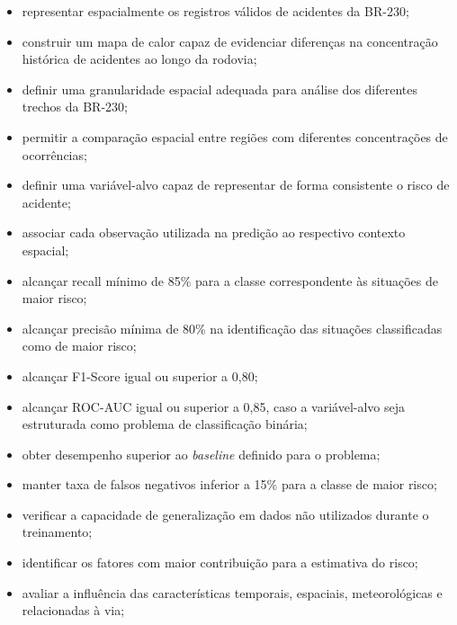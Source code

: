 \documentclass[11pt,a4paper]{article}
\begin{document}
\begin{itemize}

    \item representar espacialmente os registros válidos de acidentes da BR-230;

    \item construir um mapa de calor capaz de evidenciar diferenças na concentração histórica de acidentes ao longo da rodovia;

    \item definir uma granularidade espacial adequada para análise dos diferentes trechos da BR-230;

    \item permitir a comparação espacial entre regiões com diferentes concentrações de ocorrências;

    \item definir uma variável-alvo capaz de representar de forma consistente o risco de acidente;

    \item associar cada observação utilizada na predição ao respectivo contexto espacial;

    \item alcançar recall mínimo de 85\% para a classe correspondente às situações de maior risco;

    \item alcançar precisão mínima de 80\% na identificação das situações classificadas como de maior risco;

    \item alcançar F1-Score igual ou superior a 0,80;

    \item alcançar ROC-AUC igual ou superior a 0,85, caso a variável-alvo seja estruturada como problema de classificação binária;

    \item obter desempenho superior ao \textit{baseline} definido para o problema;

    \item manter taxa de falsos negativos inferior a 15\% para a classe de maior risco;

    \item verificar a capacidade de generalização em dados não utilizados durante o treinamento;

    \item identificar os fatores com maior contribuição para a estimativa do risco;

    \item avaliar a influência das características temporais, espaciais, meteorológicas e relacionadas à via;


\end{itemize}
\end{document}
